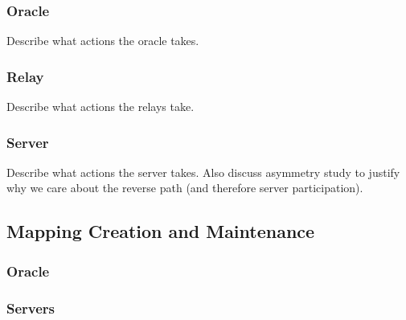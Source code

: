 \subsubsection{Oracle} Describe what actions the oracle takes.

\subsubsection{Relay} Describe what actions the relays take.

\subsubsection{Server} Describe what actions the server takes.  Also discuss asymmetry study to justify why we care about the reverse path (and therefore server participation).

\subsection{Mapping Creation and Maintenance}
\label{maps}

\subsubsection{Oracle}

\subsubsection{Servers}
